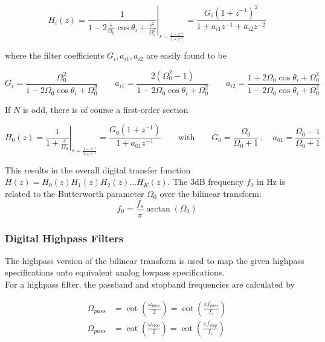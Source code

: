 \begin{equation*}
	H_i(z) = \left.\frac{1}{1 - 2 \frac{s}{\Omega_0}\cos\theta_i + \frac{s^2}{\Omega_0^2}}\right|_{s = \frac{1-z^{-1}}{1+z^{-1}}} =
	\frac{G_i (1+z^{-1})^2}{1 + a_{i1}z^{-1} + a_{i2}z^{-2}}
\end{equation*}

where the filter coefficients $G_i, a_{i1}, a_{i2}$ are easily found to be

\begin{equation*}
	G_i = \frac{\Omega_0^2}{1 - 2 \Omega_0 \cos\theta_i + \Omega_0^2} \qquad
	a_{i1} = \frac{2(\Omega_0^2 - 1)}{1 - 2 \Omega_0 \cos\theta_i + \Omega_0^2} \qquad
	a_{i2} = \frac{1 + 2 \Omega_0 \cos\theta_i + \Omega_0^2}{1 - 2 \Omega_0 \cos\theta_i + \Omega_0^2}
\end{equation*}

If $N$ is odd, there is of course a first-order section

\begin{equation*}
	H_0(z) = \left.\frac{1}{1+\frac{s}{\Omega_0}}\right|_{s = \frac{1-z^{-1}}{1+z^{-1}}}
	= \frac{G_0 (1+z^{-1})}{1 + a_{01} z^{-1}}
	\qquad \text{with} \qquad
	G_0 = \frac{\Omega_0}{\Omega_0 + 1} \:,\quad
	a_{01}=\frac{\Omega_0 - 1}{\Omega_0 + 1}
\end{equation*}

This results in the overall digital transfer function
$H(z) = H_0(z) H_1(z) H_2(z) \ldots H_K(z)$. The 3dB frequency
$f_0$ in Hz is related to the Butterworth parameter $\Omega_0$ over the
bilinear transform:
\begin{equation*}
	f_0 = \frac{f_s}{\pi} \arctan(\Omega_0)
\end{equation*}

\subsubsection{Digital Highpass Filters}
The highpass version of the bilinear transform is used to map the given
highpass specifications onto equivalent analog lowpass specifications. \\

For a highpass filter, the passband and stopband frequencies are calculated
by

\begin{align*}
	\Omega_{pass} &= \cot \left( \frac{\omega_{pass}}{2} \right)
	= \cot\left( \frac{\pi f_{pass}}{f_s} \right) \\
	\Omega_{pass} &= \cot\left(\frac{\omega_{stop}}{2}\right)
	= \cot\left(\frac{\pi f_{stop}}{f_s}\right)
\end{align*}

